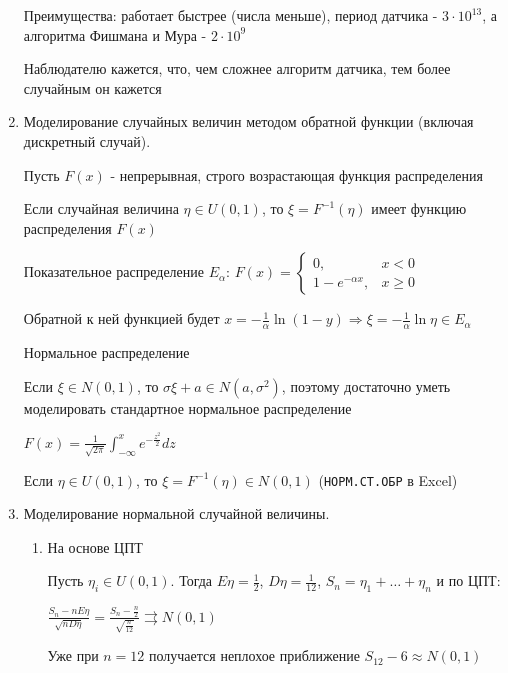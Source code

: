 \begin{enumerate}
    Преимущества: работает быстрее (числа меньше), период датчика - $3 \cdot 10^{13}$, а алгоритма Фишмана и Мура - $2 \cdot 10^9$

    Наблюдателю кажется, что, чем сложнее алгоритм датчика, тем более случайным он кажется

    \item Моделирование случайных величин методом обратной функции (включая дискретный случай).

    \begin{MyTheorem}
        \Ths Пусть $F(x)$ - непрерывная, строго возрастающая функция распределения

        Если случайная величина $\eta \in U(0, 1)$, то $\xi = F^{-1}(\eta)$ имеет функцию распределения $F(x)$
    \end{MyTheorem}

    \Ex Показательное распределение $E_\alpha$: $F(x) = \begin{cases}0, & x < 0 \\ 1 - e^{-\alpha x}, & x \geq 0\end{cases}$

    Обратной к ней функцией будет $x = -\frac{1}{\alpha} \ln (1 - y) \Longrightarrow \xi = -\frac{1}{\alpha} \ln \eta \in E_\alpha$

    \Ex Нормальное распределение

    Если $\xi \in N(0, 1)$, то $\sigma \xi + a \in N(a, \sigma^2)$, поэтому достаточно уметь моделировать стандартное нормальное распределение

    $F(x) = \frac{1}{\sqrt{2\pi}} \int_{-\infty}^x e^{-\frac{z^2}{2}} dz$

    Если $\eta \in U(0, 1)$, то $\xi = F^{-1}(\eta) \in N(0, 1)$ (\texttt{НОРМ.СТ.ОБР} в Excel)

    \item Моделирование нормальной случайной величины.

    \begin{enumerate}[label*=\Roman*. ]
        \item На основе ЦПТ

        Пусть $\eta_i \in U(0, 1)$. Тогда $E\eta = \frac{1}{2}$, $D\eta = \frac{1}{12}$, $S_n = \eta_1 + \dots + \eta_n$ и по ЦПТ:

        $\frac{S_n - nE\eta}{\sqrt{n D\eta}} = \frac{S_n - \frac{n}{2}}{\sqrt{\frac{n}{12}}} \rightrightarrows N(0, 1)$

        Уже при $n = 12$ получается неплохое приближение $S_{12} - 6 \approx N(0, 1)$ 


\end{enumerate}
\end{enumerate}
